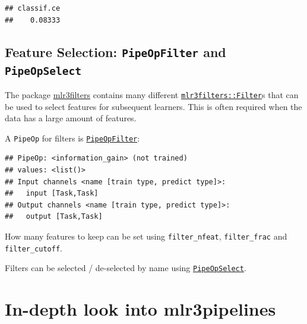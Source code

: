 \documentclass[]{scrbook}
\newenvironment{Shaded}{\begin{snugshade}}{\end{snugshade}}
\newcommand{\KeywordTok}[1]{\textcolor[rgb]{0.13,0.29,0.53}{\textbf{#1}}}
\newcommand{\NormalTok}[1]{#1}
\newcommand{\OperatorTok}[1]{\textcolor[rgb]{0.81,0.36,0.00}{\textbf{#1}}}
\renewenvironment{Shaded} {\begin{snugshade}\small} {\end{snugshade}}
\begin{document}
\begin{verbatim}
## classif.ce 
##    0.08333
\end{verbatim}

\hypertarget{feature-selection-pipeopfilter-and-pipeopselect}{%
\subsection{\texorpdfstring{Feature Selection: \texttt{PipeOpFilter} and \texttt{PipeOpSelect}}{Feature Selection: PipeOpFilter and PipeOpSelect}}\label{feature-selection-pipeopfilter-and-pipeopselect}}

The package \href{https://mlr3filters.mlr-org.com}{mlr3filters} contains many different \href{https://mlr3filters.mlr-org.com/reference/Filter.html}{\texttt{mlr3filters::Filter}}s that can be used to select features for subsequent learners.
This is often required when the data has a large amount of features.

A \texttt{PipeOp} for filters is \href{https://mlr3pipelines.mlr-org.com/reference/mlr_pipeops_filter.html}{\texttt{PipeOpFilter}}:

\begin{Shaded}
\end{Shaded}

\begin{verbatim}
## PipeOp: <information_gain> (not trained)
## values: <list()>
## Input channels <name [train type, predict type]>:
##   input [Task,Task]
## Output channels <name [train type, predict type]>:
##   output [Task,Task]
\end{verbatim}

How many features to keep can be set using \texttt{filter\_nfeat}, \texttt{filter\_frac} and \texttt{filter\_cutoff}.

Filters can be selected / de-selected by name using \href{https://mlr3pipelines.mlr-org.com/reference/mlr_pipeops_select.html}{\texttt{PipeOpSelect}}.

\hypertarget{in-depth-pipelines}{%
\section{In-depth look into mlr3pipelines}\label{in-depth-pipelines}}
\end{document}
